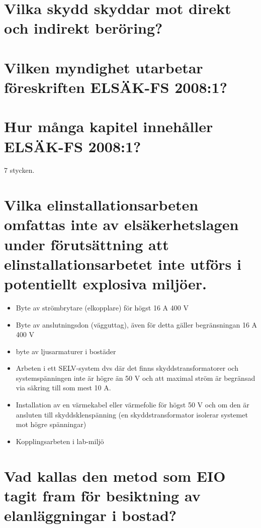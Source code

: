 \documentclass[a4paper,swedish]{article}
\begin{document}
\setcounter{section}{61}
\section{Vilka skydd skyddar mot direkt och indirekt beröring?}

\setcounter{section}{63}
\section{Vilken myndighet utarbetar föreskriften ELSÄK-FS 2008:1?}

\setcounter{section}{65}
\section{Hur många kapitel innehåller ELSÄK-FS 2008:1?}

7 stycken.

\setcounter{section}{67}
\section{Vilka elinstallationsarbeten omfattas inte av elsäkerhetslagen under förutsättning att elinstallationsarbetet inte utförs i potentiellt explosiva miljöer.}

\begin{itemize}
\item Byte av strömbrytare (elkopplare) för högst 16 A 400 V
\item Byte av anslutningsdon (vägguttag), även för detta gäller begränsningan 16 A 400 V
\item byte av ljusarmaturer i bostäder
\item Arbeten i ett SELV-system dvs där det finns skyddstransformatorer och systemspänningen inte är högre än 50 V
  och att maximal ström är begränsad via säkring till som mest 10 A.
\item Installation av en värmekabel eller värmefolie för högst 50 V och om den är ansluten till skyddsklenspänning (en skyddstransformator isolerar systemet mot högre spänningar)
\item Kopplingsarbeten i lab-miljö
\end{itemize}

\setcounter{section}{68}
\section{Vad kallas den metod som EIO tagit fram för besiktning av elanläggningar i bostad?}
\end{document}
